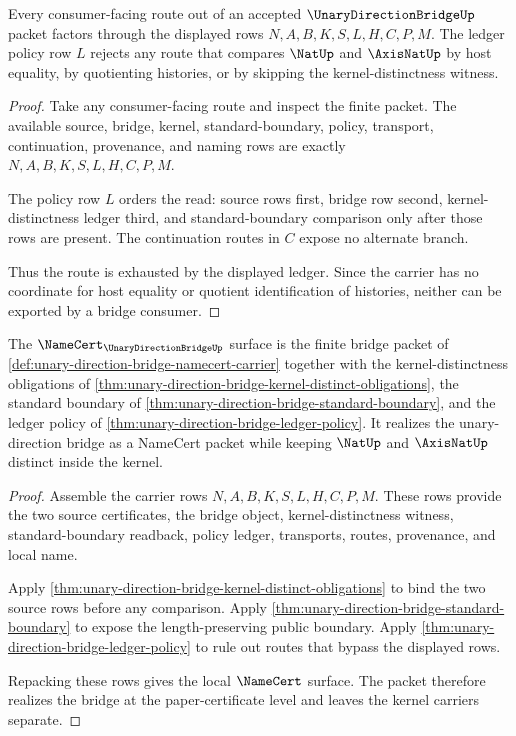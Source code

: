 \begin{theorem}
\label{thm:unary-direction-bridge-ledger-policy}
Every consumer-facing route out of an accepted $\UnaryDirectionBridgeUp$ packet factors through the displayed rows $N,A,B,K,S,L,H,C,P,M$. The ledger policy row $L$ rejects any route that compares $\NatUp$ and $\AxisNatUp$ by host equality, by quotienting histories, or by skipping the kernel-distinctness witness.
\end{theorem}
\begin{proof}
Take any consumer-facing route and inspect the finite packet. The available source, bridge, kernel, standard-boundary, policy, transport, continuation, provenance, and naming rows are exactly $N,A,B,K,S,L,H,C,P,M$.

The policy row $L$ orders the read: source rows first, bridge row second, kernel-distinctness ledger third, and standard-boundary comparison only after those rows are present. The continuation routes in $C$ expose no alternate branch.

Thus the route is exhausted by the displayed ledger. Since the carrier has no coordinate for host equality or quotient identification of histories, neither can be exported by a bridge consumer.
\end{proof}

\begin{theorem}
\label{thm:unary-direction-bridge-namecert-surface}
The $\NameCert_{\UnaryDirectionBridgeUp}$ surface is the finite bridge packet of \autoref{def:unary-direction-bridge-namecert-carrier} together with the kernel-distinctness obligations of \autoref{thm:unary-direction-bridge-kernel-distinct-obligations}, the standard boundary of \autoref{thm:unary-direction-bridge-standard-boundary}, and the ledger policy of \autoref{thm:unary-direction-bridge-ledger-policy}. It realizes the unary-direction bridge as a NameCert packet while keeping $\NatUp$ and $\AxisNatUp$ distinct inside the kernel.
\end{theorem}
\begin{proof}
Assemble the carrier rows $N,A,B,K,S,L,H,C,P,M$. These rows provide the two source certificates, the bridge object, kernel-distinctness witness, standard-boundary readback, policy ledger, transports, routes, provenance, and local name.

Apply \autoref{thm:unary-direction-bridge-kernel-distinct-obligations} to bind the two source rows before any comparison. Apply \autoref{thm:unary-direction-bridge-standard-boundary} to expose the length-preserving public boundary. Apply \autoref{thm:unary-direction-bridge-ledger-policy} to rule out routes that bypass the displayed rows.

Repacking these rows gives the local $\NameCert$ surface. The packet therefore realizes the bridge at the paper-certificate level and leaves the kernel carriers separate.
\end{proof}

